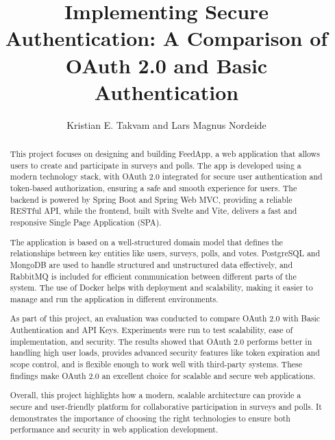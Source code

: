 \documentclass[11pt]{article}
\begin{document}
\title{Implementing Secure Authentication: A Comparison of OAuth 2.0 and Basic Authentication}

\author{Kristian E. Takvam and Lars Magnus Nordeide}

\maketitle

\begin{abstract}
This project focuses on designing and building FeedApp, a web application that allows users to create and participate in surveys and polls. The app is developed using a modern technology stack, with OAuth 2.0 integrated for secure user authentication and token-based authorization, ensuring a safe and smooth experience for users. The backend is powered by Spring Boot and Spring Web MVC, providing a reliable RESTful API, while the frontend, built with Svelte and Vite, delivers a fast and responsive Single Page Application (SPA).

The application is based on a well-structured domain model that defines the relationships between key entities like users, surveys, polls, and votes. PostgreSQL and MongoDB are used to handle structured and unstructured data effectively, and RabbitMQ is included for efficient communication between different parts of the system. The use of Docker helps with deployment and scalability, making it easier to manage and run the application in different environments.

As part of this project, an evaluation was conducted to compare OAuth 2.0 with Basic Authentication and API Keys. Experiments were run to test scalability, ease of implementation, and security. The results showed that OAuth 2.0 performs better in handling high user loads, provides advanced security features like token expiration and scope control, and is flexible enough to work well with third-party systems. These findings make OAuth 2.0 an excellent choice for scalable and secure web applications.

Overall, this project highlights how a modern, scalable architecture can provide a secure and user-friendly platform for collaborative participation in surveys and polls. It demonstrates the importance of choosing the right technologies to ensure both performance and security in web application development.

\end{abstract}

%














{}
\end{document}
